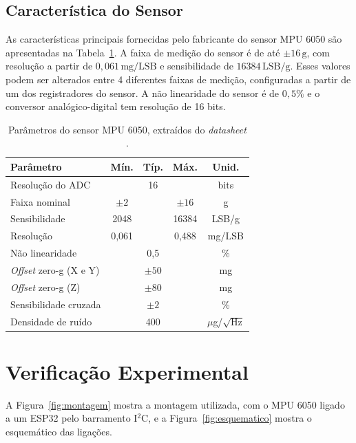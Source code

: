 \documentclass[conference]{IEEEtran}
\begin{document}
\subsection{Característica do Sensor}

As características principais fornecidas pelo fabricante do sensor MPU 6050 são apresentadas na Tabela~\ref{tab:parametros}. A faixa de medição do sensor é de até $\pm 16\,\mathrm{g}$, com resolução a partir de $0{,}061\,\mathrm{mg/LSB}$ e sensibilidade de $16384\,\mathrm{LSB/g}$. Esses valores podem ser alterados entre 4 diferentes faixas de medição, configuradas a partir de um dos registradores do sensor. A não linearidade do sensor é de $0{,}5\%$ e o conversor analógico-digital tem resolução de 16 bits.

\begin{table}[!t]
	\caption{Parâmetros do sensor MPU 6050, extraídos do \textit{datasheet} \cite{mpu6050}.}
	\label{tab:parametros}
	\centering
	\renewcommand{\arraystretch}{1.3}
	\setlength{\tabcolsep}{5pt}
	\begin{tabular}{|l|c|c|c|c|} \hline
		\textbf{Parâmetro} & \textbf{Mín.} & \textbf{Típ.} & \textbf{Máx.} & \textbf{Unid.} \\ \hline
		Resolução do ADC & & 16 & & bits \\ \hline
		Faixa nominal & $\pm 2$ & & $\pm 16$ & g \\ \hline
		Sensibilidade & 2048 & & 16384 & LSB/g \\ \hline
		Resolução & 0,061 & & 0,488 & mg/LSB \\ \hline
		Não linearidade & & 0,5 & & \% \\ \hline
		\textit{Offset} zero-g (X e Y) & & $\pm 50$ & & mg \\ \hline
		\textit{Offset} zero-g (Z) & & $\pm 80$ & & mg \\ \hline
		Sensibilidade cruzada & & $\pm 2$ & & \% \\ \hline
		Densidade de ruído & & 400 & & $\mu$g/$\sqrt{\mathrm{Hz}}$ \rule[-1.2ex]{0pt}{3.6ex} \\ \hline
	\end{tabular}
\end{table}

\section{Verificação Experimental}
\label{sec:verificacao}
A Figura~\ref{fig:montagem} mostra a montagem utilizada, com o MPU 6050 ligado a um ESP32 pelo barramento I$^2$C, e a Figura~\ref{fig:esquematico} mostra o esquemático das ligações.
\end{document}
